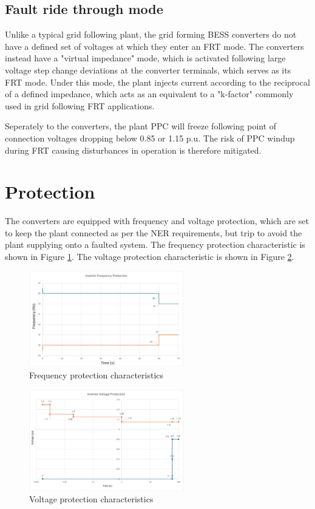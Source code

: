 \documentclass{../grid-link-report}
\begin{document}
	\subsection{Fault ride through mode}
	
	Unlike a typical grid following plant, the grid forming BESS converters do not have a defined set of voltages at which they enter an FRT mode. The converters instead have a "virtual impedance" mode, which is activated following large voltage step change deviations at the converter terminals, which serves as its FRT mode. Under this mode, the plant injects current according to the reciprocal of a defined impedance, which acts as an equivalent to a "k-factor" commonly used in grid following FRT applications.

	Seperately to the converters, the plant PPC will freeze following point of connection voltages dropping below 0.85 or 1.15 p.u. The risk of PPC windup during FRT causing disturbances in operation is therefore mitigated.
	
	\section{Protection}
	
	The converters are equipped with frequency and voltage protection, which are set to keep the plant connected as per the NER requirements, but trip to avoid the plant supplying onto a faulted system. The frequency protection characteristic is shown in Figure \ref{fig:fprotection}. The voltage protection characteristic is shown in Figure \ref{fig:vprotection}.
	
	\begin{figure}[H]
		\centering
		\includegraphics[width=0.6\textwidth]{report-assets/images/fprotection.png}
		\caption{Frequency protection characteristics}
		\label{fig:fprotection}
	\end{figure}
	
	\begin{figure}[H]
		\centering
		\includegraphics[width=0.6\textwidth]{report-assets/images/vprotection-new.png}
		\caption{Voltage protection characteristics}
		\label{fig:vprotection}
	\end{figure}
\end{document}
